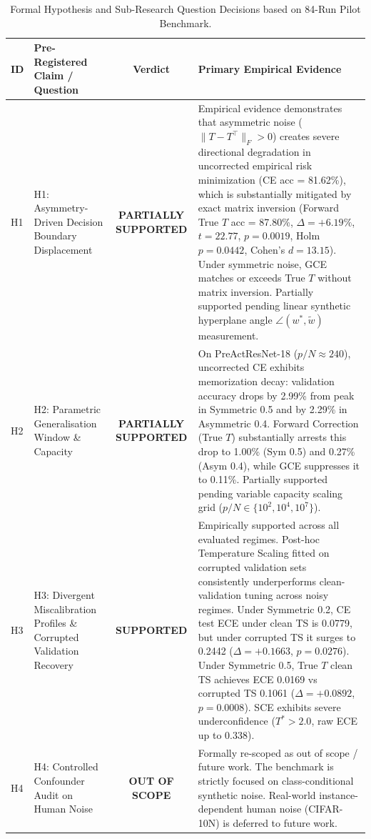 \begin{table}[t]
\centering
\caption{Formal Hypothesis and Sub-Research Question Decisions based on 84-Run Pilot Benchmark.}
\label{tab:hypotheses}
\small
\begin{tabular}{lp{5.5cm}cp{7.5cm}}
\hline
\textbf{ID} & \textbf{Pre-Registered Claim / Question} & \textbf{Verdict} & \textbf{Primary Empirical Evidence} \\
\hline
H1 & H1: Asymmetry-Driven Decision Boundary Displacement & \textbf{PARTIALLY SUPPORTED} & Empirical evidence demonstrates that asymmetric noise ($\|T - T^\top\|_F > 0$) creates severe directional degradation in uncorrected empirical risk minimization (CE acc = 81.62\%), which is substantially mitigated by exact matrix inversion (Forward True $T$ acc = 87.80\%, $\Delta = +6.19\%$, $t = 22.77$, $p = 0.0019$, Holm $p = 0.0442$, Cohen's $d = 13.15$). Under symmetric noise, GCE matches or exceeds True $T$ without matrix inversion. Partially supported pending linear synthetic hyperplane angle $\angle(w^*, \tilde{w})$ measurement. \\
H2 & H2: Parametric Generalisation Window \& Capacity & \textbf{PARTIALLY SUPPORTED} & On PreActResNet-18 ($p/N \approx 240$), uncorrected CE exhibits memorization decay: validation accuracy drops by 2.99\% from peak in Symmetric 0.5 and by 2.29\% in Asymmetric 0.4. Forward Correction (True $T$) substantially arrests this drop to 1.00\% (Sym 0.5) and 0.27\% (Asym 0.4), while GCE suppresses it to 0.11\%. Partially supported pending variable capacity scaling grid ($p/N \in \{10^2, 10^4, 10^7\}$). \\
H3 & H3: Divergent Miscalibration Profiles \& Corrupted Validation Recovery & \textbf{SUPPORTED} & Empirically supported across all evaluated regimes. Post-hoc Temperature Scaling fitted on corrupted validation sets consistently underperforms clean-validation tuning across noisy regimes. Under Symmetric 0.2, CE test ECE under clean TS is 0.0779, but under corrupted TS it surges to 0.2442 ($\Delta = +0.1663$, $p = 0.0276$). Under Symmetric 0.5, True $T$ clean TS achieves ECE 0.0169 vs corrupted TS 0.1061 ($\Delta = +0.0892$, $p = 0.0008$). SCE exhibits severe underconfidence ($T^* > 2.0$, raw ECE up to 0.338). \\
H4 & H4: Controlled Confounder Audit on Human Noise & \textbf{OUT OF SCOPE} & Formally re-scoped as out of scope / future work. The benchmark is strictly focused on class-conditional synthetic noise. Real-world instance-dependent human noise (CIFAR-10N) is deferred to future work. \\

\end{tabular}
\end{table}
